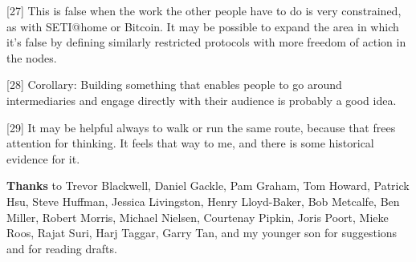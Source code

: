 [27] This is false when the work the other people have to do is
                  very constrained, as with SETI@home or Bitcoin. It may be
                  possible to expand the area in which it's false by defining
                  similarly restricted protocols with more freedom of action in
                  the nodes.

[28] Corollary: Building something that enables people to go
                  around intermediaries and engage directly with their audience
                  is probably a good idea.

[29] It may be helpful always to walk or run the same route,
                  because that frees attention for thinking. It feels that way
                  to me, and there is some historical evidence for it.



\textbf{Thanks}
                    to Trevor Blackwell, Daniel Gackle, Pam Graham, Tom Howard,
                    Patrick Hsu, Steve Huffman, Jessica Livingston, Henry
                    Lloyd-Baker, Bob Metcalfe, Ben Miller, Robert Morris,
                    Michael Nielsen, Courtenay Pipkin, Joris Poort, Mieke Roos,
                    Rajat Suri, Harj Taggar, Garry Tan, and my younger son for
                    suggestions and for reading drafts. 


              
            
          
          
            
              
                


                  
              
            
          
        
